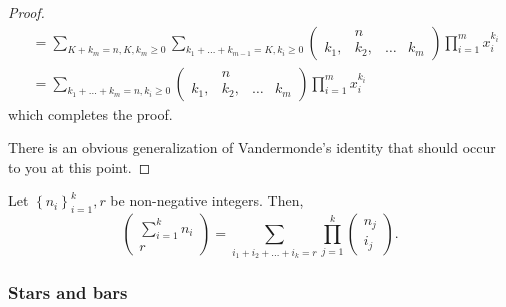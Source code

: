 \begin{proof}
\begin{align*}
 & =\sum_{K+k_{m}=n,K,k_{m}\geq0}\sum_{k_{1}+\ldots+k_{m-1}=K,k_{i}\geq0}\left(\begin{array}{cccc}
 & n\\
k_{1}, & k_{2}, & \ldots & k_{m}
\end{array}\right)\prod_{i=1}^{m}x_{i}^{k_{i}}\\
 & =\sum_{k_{1}+\ldots+k_{m}=n,k_{i}\geq0}\left(\begin{array}{cccc}
 & n\\
k_{1}, & k_{2}, & \ldots & k_{m}
\end{array}\right)\prod_{i=1}^{m}x_{i}^{k_{i}}
\end{align*}
which completes the proof.

There is an obvious generalization of Vandermonde's identity that
should occur to you at this point.
\end{proof}
\begin{prop}
\label{prop:generalizedVandermondeIdentity}Let $\left\{ n_{i}\right\} _{i=1}^{k},r$
be non-negative integers. Then,
\[
\left(\begin{array}{c}
\sum_{i=1}^{k}n_{i}\\
r
\end{array}\right)=\sum_{i_{1}+i_{2}+\ldots+i_{k}=r}\prod_{j=1}^{k}\left(\begin{array}{c}
n_{j}\\
i_{j}
\end{array}\right).
\]
\end{prop}


\subsubsection{Stars and bars}

